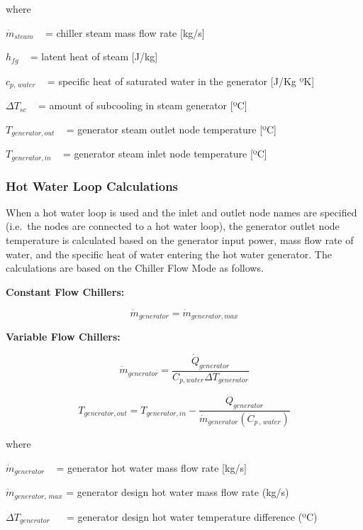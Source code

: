 where

\({\dot m_{steam}}\) ~ = chiller steam mass flow rate {[}kg/s{]}

\({h_{fg}}\) ~ = latent heat of steam {[}J/kg{]}

\({c_{p,\,water}}\) ~ = specific heat of saturated water in the generator {[}J/Kg ºK{]}

\(\Delta {T_{sc}}\) ~ = amount of subcooling in steam generator {[}ºC{]}

\({T_{generator,out}}\) ~ = generator steam outlet node temperature {[}ºC{]}

\({T_{generator,in}}\) ~ = generator steam inlet node temperature {[}ºC{]}

\subsubsection{Hot Water Loop Calculations}\label{hot-water-loop-calculations}

When a hot water loop is used and the inlet and outlet node names are specified (i.e.~the nodes are connected to a hot water loop), the generator outlet node temperature is calculated based on the generator input power, mass flow rate of water, and the specific heat of water entering the hot water generator. The calculations are based on the Chiller Flow Mode as follows.

\textbf{Constant Flow Chillers:}

\begin{equation}
{\dot m_{generator}} = {\dot m_{generator,max}}
\end{equation}

\textbf{Variable Flow Chillers:}

\begin{equation}
  \dot{m}_{generator} = \frac{\dot{Q}_{generator}}{C_{p,water}\Delta T_{generator}}
\end{equation}

\begin{equation}
{T_{generator,out}} = {T_{generator,in}} - \frac{{{{\dot Q}_{generator}}}}{{{{\dot m}_{generator}}\left( {{C_{p\,,\,water}}} \right)}}
\end{equation}

where

\({\dot m_{generator}}\) ~ = generator hot water mass flow rate {[}kg/s{]}

\({\dot m_{generator,\,max}}\) = generator design hot water mass flow rate (kg/s)

\(\Delta {T_{generator}}\) ~~ = generator design hot water temperature difference (ºC)

